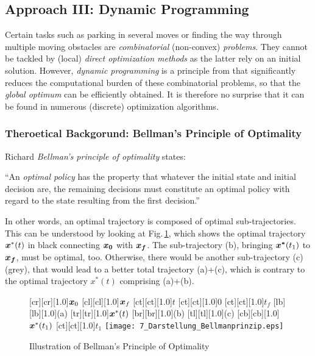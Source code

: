 \subsection{Approach III: Dynamic Programming}\label{S:57.3.3}
Certain tasks such as parking in several moves or finding the way through multiple moving obstacles are \emph{combinatorial} (non-convex) \emph{problems}. They cannot be tackled by (local) \textit{direct optimization methods} as the latter rely on an initial solution. However, \emph{dynamic programming} is a principle from \cite{bellman_DP} 
that significantly reduces the computational burden of these combinatorial problems, so that the \emph{global optimum} can be efficiently obtained. It is therefore no surprise that it can be found in numerous (discrete) optimization algorithms.


\subsubsection{Theroetical Backgorund: Bellman’s Principle of Optimality}\label{S:57.3.3.1}
Richard \emph{Bellman’s principle of optimality} states:

\begin{definition}
“An \textit{optimal policy} has the property that whatever the initial state and initial decision are, the remaining decisions must constitute an optimal policy with regard to the state resulting from the first decision.” 
\end{definition}
In other words, an optimal trajectory is composed of optimal sub-trajectories. This can be understood by looking at Fig.\,\ref{fig:Darstellung_Bellmanprinzip}, which shows the optimal trajectory $\boldsymbol{x}^\ast (t)$ in black connecting $\boldsymbol{x_0}$ with $\boldsymbol{x_f}$. The sub-trajectory (b), bringing $\boldsymbol{x^\ast} (t_1 )$ to $\boldsymbol{x_f}$, must be optimal, too. Otherwise, there would be another sub-trajectory (c) (grey), that would lead to a better total trajectory (a)+(c), which is contrary to the optimal trajectory $x^\ast (t)$ comprising (a)+(b).
\begin{figure}[h]
	[cr][cr][1.0]{$\boldsymbol{x}_0$}
	[cl][cl][1.0]{$\boldsymbol{x}_f$}
	[ct][ct][1.0]{$t$}
	[ct][ct][1.0]{$0$}
	[ct][ct][1.0]{$t_f$}
	[lb][lb][1.0]{(a)}
	[tr][tr][1.0]{$\boldsymbol{x}^\ast(t)$}
	[br][br][1.0]{(b)}
	[tl][tl][1.0]{(c)}
	[cb][cb][1.0]{$\boldsymbol{x}^\ast(t_1)$}
	[ct][ct][1.0]{$t_1$}
	\centering
 \texttt{[image: 7\_Darstellung\_Bellmanprinzip.eps]}
	\caption[Bellman’s Principle of Optimality]{Illustration of Bellman’s Principle of Optimality} 
	\label{fig:Darstellung_Bellmanprinzip}
\end{figure} 

